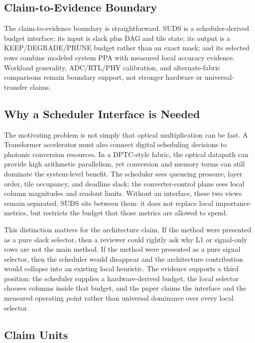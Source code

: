 \documentclass[10pt,journal]{IEEEtran}
\begin{document}
\subsection{Claim-to-Evidence Boundary}

The claim-to-evidence boundary is straightforward. SUDS is a
scheduler-derived budget interface; its input is slack plus DAG and tile state;
its output is a KEEP/DEGRADE/PRUNE budget rather than an exact mask; and its
selected rows combine modeled system PPA with measured local accuracy evidence.
Workload generality, ADC/RTL/PHY calibration, and alternate-fabric comparisons
remain boundary support, not stronger hardware or universal-transfer claims.

\subsection{Why a Scheduler Interface is Needed}

The motivating problem is not simply that optical multiplication can be fast.
A Transformer accelerator must also connect digital scheduling decisions to
photonic conversion resources. In a DPTC-style fabric, the optical datapath can
provide high arithmetic parallelism, yet conversion and memory terms can still
dominate the system-level benefit. The scheduler sees queueing pressure, layer
order, tile occupancy, and deadline slack; the converter-control plane sees
local column magnitudes and readout limits. Without an interface, these two
views remain separated. SUDS sits between them: it does not replace local
importance metrics, but restricts the budget that those metrics are allowed to
spend.

This distinction matters for the architecture claim.
If the method were presented as a pure slack selector, then a reviewer could
rightly ask why L1 or signal-only rows are not the main method.
If the method were presented as a pure signal selector, then the scheduler
would disappear and the architecture contribution would collapse into an
existing local heuristic.
The evidence supports a third position: the scheduler supplies a
hardware-derived budget, the local selector chooses columns inside that budget,
and the paper claims the interface and the measured operating point rather than
universal dominance over every local selector.

\subsection{Claim Units}
\end{document}
